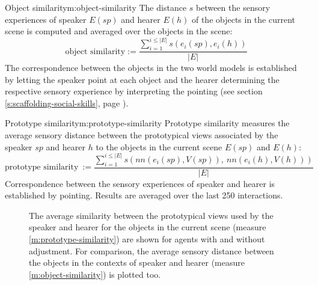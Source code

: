 \begin{measure}[b]{Object similarity}{m:object-similarity}
  The distance $s$ between the sensory experiences of speaker $E(sp)$
  and hearer $E(h)$ of the objects in the current scene is computed
  and averaged over the objects in the scene: $$\text{object
    similarity} :=
  \frac{\sum_{i=1}^{i\leq|E|}s\left(e_i(sp),e_i(h)\right)}{|E|}$$ The
  correspondence between the objects in the two world models is
  established by letting the speaker point at each object and the
  hearer determining the respective sensory experience by interpreting
  the pointing (see section \ref{s:scaffolding-social-skills}, page
  \pageref{s:scaffolding-social-skills}).
\end{measure}

\begin{measure}[b]{Prototype similarity}{m:prototype-similarity}
  Prototype similarity measures the average sensory distance between
  the prototypical views associated by the speaker $sp$ and hearer $h$
  to the objects in the current scene $E(sp)$ and $E(h)$:
  $$\text{prototype similarity}
  ~:=\frac{\sum_{i=1}^{i\leq|E|}s\left(nn\left(e_i(sp),V(sp)\right),\
      nn\left(e_i(h),V(h)\right)\right)}{|E|}$$ Correspondence between
  the sensory experiences of speaker and hearer is established by
  pointing. Results are averaged over the last 250 interactions.
\end{measure}

\begin{figure}[t]
  \caption{The average similarity between the prototypical views used
    by the speaker and hearer for the objects in the current scene
    (measure \ref{m:prototype-similarity}) are shown for agents with
    and without adjustment. For comparison, the average sensory
    distance between the objects in the contexts of speaker and hearer
    (measure \ref{m:object-similarity}) is plotted too. }
  \label{f:gng-prototype-similarity}
\end{figure}

